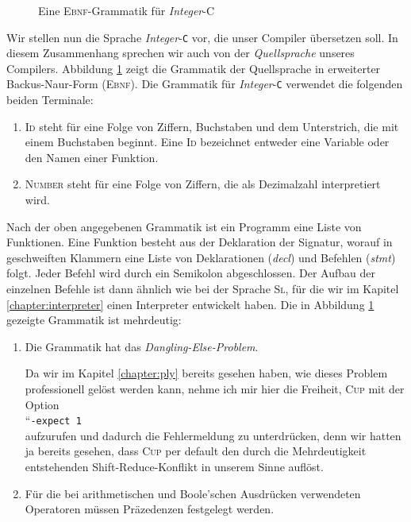 \begin{figure}[!ht]
\begin{center}
\begin{minipage}[t]{12.5cm}
  \end{minipage}
  \end{center}
  \caption{Eine \textsc{Ebnf}-Grammatik f\"ur \textsl{Integer}-\textsc{C}}
\label{fig:compiler.cup}
\end{figure}

\noindent
Wir stellen nun die Sprache \textsl{Integer}-\texttt{C} vor, die unser Compiler \"ubersetzen
soll.  In diesem Zusammenhang sprechen wir auch von der \emph{Quellsprache} unseres Compilers.
Abbildung \ref{fig:compiler.cup} zeigt die Grammatik der Quellsprache in 
erweiterter Backus-Naur-Form (\textsc{Ebnf}). 
Die Grammatik f\"ur \textsl{Integer}-\texttt{C} verwendet die folgenden beiden Terminale:
\begin{enumerate}
\item \textsc{Id} steht f\"ur eine Folge von Ziffern, Buchstaben und dem Unterstrich, die 
      mit einem Buchstaben beginnt.  Eine \textsc{Id} bezeichnet entweder eine Variable oder
      den Namen einer Funktion.
\item \textsc{Number} steht f\"ur eine Folge von Ziffern, die als Dezimalzahl interpretiert wird.
\end{enumerate}
Nach der oben angegebenen Grammatik ist ein Programm eine Liste von Funktionen.
Eine Funktion besteht aus der Deklaration der Signatur, worauf in geschweiften Klammern
eine Liste von Deklarationen (\textsl{decl}) und Befehlen (\textsl{stmt}) folgt.  Jeder Befehl wird
durch ein Semikolon abgeschlossen.  Der Aufbau der einzelnen Befehle ist dann
\"ahnlich wie bei der Sprache \textsc{Sl}, f\"ur die wir im Kapitel \ref{chapter:interpreter}
einen Interpreter entwickelt haben.
Die in Abbildung \ref{fig:compiler.cup} gezeigte Grammatik ist mehrdeutig:
\begin{enumerate}
\item Die Grammatik hat das \emph{Dangling-Else-Problem}.

      Da wir im Kapitel \ref{chapter:ply} bereits gesehen haben, wie dieses Problem
      professionell gel\"ost werden kann, nehme ich mir hier die Freiheit, \textsc{Cup} mit der Option
      \\[0.2cm]
      \hspace*{1.3cm}
      ``\texttt{-expect 1}
      \\[0.2cm]
      aufzurufen und dadurch die Fehlermeldung zu unterdr\"ucken, denn wir hatten ja bereits gesehen, dass
      \textsc{Cup} per default den durch die Mehrdeutigkeit entstehenden Shift-Reduce-Konflikt in unserem
      Sinne aufl\"ost. 
\item F\"ur die bei arithmetischen und Boole'schen Ausdr\"ucken verwendeten Operatoren
      m\"ussen Pr\"azedenzen festgelegt werden.
\end{enumerate}

